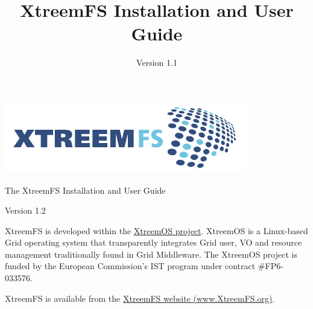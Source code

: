 \documentclass[a4paper,10pt]{book}
\title{XtreemFS Installation and User Guide}
\date{Version 1.1}
\begin{document}
\begin{titlepage}
\begin{flushright}
 \includegraphics{images/final_logo.pdf}
\end{flushright}

\vspace{3cm}

\begin{flushleft}
\sffamily \begin{LARGE}The XtreemFS Installation and User Guide\end{LARGE}

Version 1.2
\end{flushleft}


\end{titlepage}
\garamond
{}

XtreemFS is developed within the \href{http://www.xtreemos.eu}{XtreemOS project}. XtreemOS is a Linux-based Grid operating system that transparently integrates Grid user, VO and resource management traditionally found in Grid Middleware. The XtreemOS project is funded by the European Commission's IST program under contract \#FP6-033576.

XtreemFS is available from the \href{http://www.XtreemFS.org}{XtreemFS website (www.XtreemFS.org)}.
\end{document}

